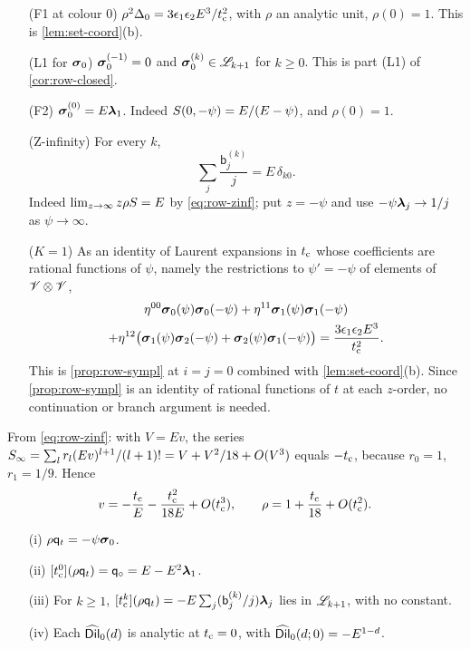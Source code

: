 \begin{enumerate}
\item[(F1 at colour 0)] $\rho^2\Delta_0=3\epsilon_1\epsilon_2E^3/t_{\mathrm{c}}^2$, with $\rho$ an analytic unit, $\rho(0)=1$. This is \cref{lem:set-coord}(b).
\item[(L1 for $\brow_0$)] $\boldsymbol{\sigma}_0^{(-1)}=0$ and $\boldsymbol{\sigma}_0^{(k)}\in\mathscr{L}_{k+1}$ for $k\ge0$. This is part (L1) of \cref{cor:row-closed}.
\item[(F2)] $\boldsymbol{\sigma}_0^{(0)}=E\boldsymbol{\lambda}_1$. Indeed $S(0,-\psi)=E/(E-\psi)$, and $\rho(0)=1$.
\item[(Z-infinity)] For every $k$,
\begin{equation}\label{eq:lea-Zinf}
\sum_j\frac{\mathsf{b}_j^{(k)}}{j}=E\,\delta_{k0}.
\end{equation}
Indeed $\lim_{z\to\infty}z\rho S=E$ by \cref{eq:row-zinf}; put $z=-\psi$ and use $-\psi\boldsymbol{\lambda}_j\to1/j$ as $\psi\to\infty$.
\item[($K=1$)] As an identity of Laurent expansions in $t_{\mathrm{c}}$ whose coefficients are rational functions of $\psi$, namely the restrictions to $\psi'=-\psi$ of elements of $\mathscr{V}\otimes\mathscr{V}$,
\begin{multline}\label{eq:lea-K1}
\eta^{00}\boldsymbol{\sigma}_0(\psi)\boldsymbol{\sigma}_0(-\psi)+\eta^{11}\boldsymbol{\sigma}_1(\psi)\boldsymbol{\sigma}_1(-\psi)\\
+\eta^{12}\bigl(\boldsymbol{\sigma}_1(\psi)\boldsymbol{\sigma}_2(-\psi)+\boldsymbol{\sigma}_2(\psi)\boldsymbol{\sigma}_1(-\psi)\bigr)=\frac{3\epsilon_1\epsilon_2E^3}{t_{\mathrm{c}}^2}.
\end{multline}
This is \cref{prop:row-sympl} at $i=j=0$ combined with \cref{lem:set-coord}(b). Since \cref{prop:row-sympl} is an identity of rational functions of $t$ at each $z$-order, no continuation or branch argument is needed.
\end{enumerate}

From \cref{eq:row-zinf}: with $V=Ev$, the series $S_{\infty}=\sum_lr_l(Ev)^{l+1}/(l+1)!=V+V^2/18+O(V^3)$ equals $-t_{\mathrm{c}}$, because $r_0=1$, $r_1=1/9$. Hence
\begin{equation}\label{eq:lea-vexp}
v=-\frac{t_{\mathrm{c}}}{E}-\frac{t_{\mathrm{c}}^2}{18E}+O(t_{\mathrm{c}}^3),\qquad\rho=1+\frac{t_{\mathrm{c}}}{18}+O(t_{\mathrm{c}}^2).
\end{equation}

\begin{lem}\label{lem:lea-D0}
\leavevmode
\begin{enumerate}
\item[(i)] $\rho\mathsf{q}_{t}=-\psi\boldsymbol{\sigma}_0$.
\item[(ii)] $[t_{\mathrm{c}}^0](\rho\mathsf{q}_{t})=\mathsf{q}_{\circ}=E-E^2\boldsymbol{\lambda}_1$.
\item[(iii)] For $k\ge1$, $[t_{\mathrm{c}}^k](\rho\mathsf{q}_{t})=-E\sum_j(\mathsf{b}_j^{(k)}/j)\boldsymbol{\lambda}_j$ lies in $\mathscr{L}_{k+1}$, with no constant.
\item[(iv)] Each $\widehat{\mathsf{Dil}}_0(d)$ is analytic at $t_{\mathrm{c}}=0$, with $\widehat{\mathsf{Dil}}_0(d;0)=-E^{1-d}$.
\end{enumerate}
\end{lem}

